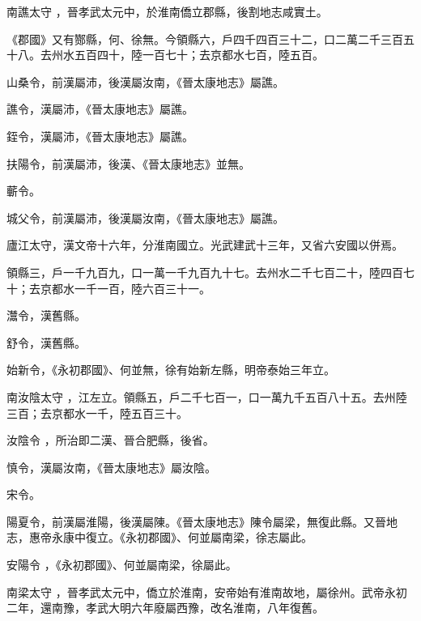 \begin{pinyinscope}
南譙太守
 ，晉孝武太元中，於淮南僑立郡縣，後割地志咸實土。



 《郡國》又有酂縣，何、徐無。今領縣六，戶四千四百三十二，口二萬二千三百五十八。去州水五百四十，陸一百七十；去京都水七百，陸五百。



 山桑令，前漢屬沛，後漢屬汝南，《晉太康地志》屬譙。



 譙令，漢屬沛，《晉太康地志》屬譙。



 銍令，漢屬沛，《晉太康地志》屬譙。



 扶陽令，前漢屬沛，後漢、《晉太康地志》並無。


蘄令。



 城父令，前漢屬沛，後漢屬汝南，《晉太康地志》屬譙。



 廬江太守，漢文帝十六年，分淮南國立。光武建武十三年，又省六安國以併焉。



 領縣三，戶一千九百九，口一萬一千九百九十七。去州水二千七百二十，陸四百七十；去京都水一千一百，陸六百三十一。



 灊令，漢舊縣。



 舒令，漢舊縣。



 始新令，《永初郡國》、何並無，徐有始新左縣，明帝泰始三年立。


南汝陰太守
 ，江左立。領縣五，戶二千七百一，口一萬九千五百八十五。去州陸三百；去京都水一千，陸五百三十。


汝陰令
 ，所治即二漢、晉合肥縣，後省。



 慎令，漢屬汝南，《晉太康地志》屬汝陰。


宋令。



 陽夏令，前漢屬淮陽，後漢屬陳。《晉太康地志》陳令屬梁，無復此縣。又晉地志，惠帝永康中復立。《永初郡國》、何並屬南梁，徐志屬此。


安陽令
 ，《永初郡國》、何並屬南梁，徐屬此。


南梁太守
 ，晉孝武太元中，僑立於淮南，安帝始有淮南故地，屬徐州。武帝永初二年，還南豫，孝武大明六年廢屬西豫，改名淮南，八年復舊。



\end{pinyinscope}
